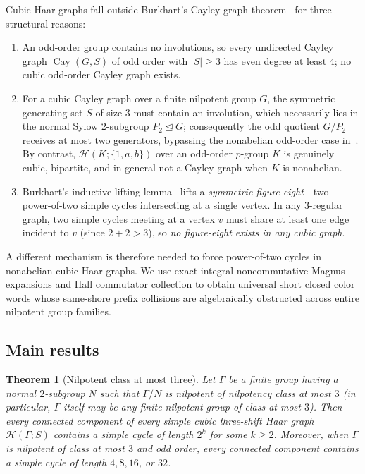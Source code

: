 \documentclass[11pt]{amsart}
\newtheorem{theorem}{Theorem}[section]
\theoremstyle{definition}
\theoremstyle{remark}
\newcommand{\Cay}{\operatorname{Cay}}
\newcommand{\Haar}{\mathcal{H}}
\begin{document}
Cubic Haar graphs fall outside Burkhart's Cayley-graph theorem~\cite{Burkhart2026} for three structural reasons:
\begin{enumerate}[label=(\roman*)]
\item An odd-order group contains no involutions, so every undirected Cayley graph $\Cay(G, S)$ of odd order with $|S| \ge 3$ has even degree at least $4$; no cubic odd-order Cayley graph exists.
\item For a cubic Cayley graph over a finite nilpotent group $G$, the symmetric generating set $S$ of size $3$ must contain an involution, which necessarily lies in the normal Sylow $2$-subgroup $P_2 \trianglelefteq G$; consequently the odd quotient $G/P_2$ receives at most two generators, bypassing the nonabelian odd-order case in~\cite[Corollary~1.4]{Burkhart2026}. By contrast, $\Haar(K; \{1,a,b\})$ over an odd-order $p$-group $K$ is genuinely cubic, bipartite, and in general not a Cayley graph when $K$ is nonabelian.
\item Burkhart's inductive lifting lemma~\cite[Lemma~1.2]{Burkhart2026} lifts a \emph{symmetric figure-eight}---two power-of-two simple cycles intersecting at a single vertex. In any $3$-regular graph, two simple cycles meeting at a vertex $v$ must share at least one edge incident to $v$ (since $2 + 2 > 3$), so \emph{no figure-eight exists in any cubic graph}.
\end{enumerate}

A different mechanism is therefore needed to force power-of-two cycles in nonabelian cubic Haar graphs. We use exact integral noncommutative Magnus expansions and Hall commutator collection to obtain universal short closed color words whose same-shore prefix collisions are algebraically obstructed across entire nilpotent group families.

\subsection{Main results}

\begin{theorem}[Nilpotent class at most three]\label{thm:class3}
Let $\Gamma$ be a finite group having a normal $2$-subgroup $N$ such that $\Gamma/N$ is nilpotent of nilpotency class at most $3$ (in particular, $\Gamma$ itself may be any finite nilpotent group of class at most $3$). Then every connected component of every simple cubic three-shift Haar graph $\Haar(\Gamma; S)$ contains a simple cycle of length $2^k$ for some $k \ge 2$. Moreover, when $\Gamma$ is nilpotent of class at most $3$ and odd order, every connected component contains a simple cycle of length $4, 8, 16$, or $32$.
\end{theorem}
\end{document}
